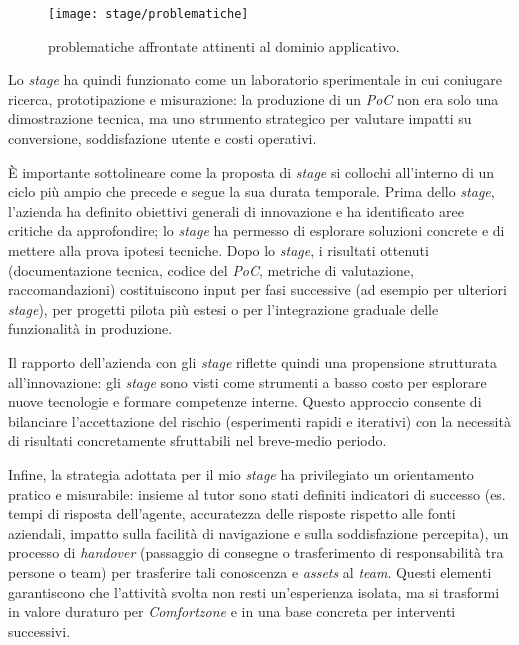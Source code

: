 \begin{figure}[htbp]
  \centering
  \texttt{[image: stage/problematiche]}
  \caption{problematiche affrontate attinenti al dominio applicativo.}
  \label{fig:problematiche}
\end{figure}
 
Lo \emph{stage} ha quindi funzionato come un laboratorio sperimentale in cui coniugare ricerca, prototipazione e misurazione: la produzione di un \emph{PoC} non era solo una dimostrazione tecnica, 
ma uno strumento strategico per valutare impatti su conversione, soddisfazione utente e costi operativi.

È importante sottolineare come la proposta di \emph{stage} si collochi all'interno di un ciclo più ampio che precede e segue la sua durata temporale. Prima dello \emph{stage}, 
l'azienda ha definito obiettivi generali di innovazione e ha identificato aree critiche da approfondire; lo \emph{stage} ha permesso di esplorare soluzioni concrete e di mettere 
alla prova ipotesi tecniche. Dopo lo \emph{stage}, i risultati ottenuti (documentazione tecnica, codice del \emph{PoC}, metriche di valutazione, raccomandazioni) 
costituiscono input per fasi successive (ad esempio per ulteriori \emph{stage}), per progetti pilota più estesi o per l'integrazione graduale delle funzionalità in produzione.

Il rapporto dell'azienda con gli \emph{stage} riflette quindi una propensione strutturata all'innovazione: gli \emph{stage} sono visti come strumenti a basso costo per esplorare nuove tecnologie e
formare competenze interne. Questo approccio consente di bilanciare l'accettazione del rischio (esperimenti rapidi e iterativi) 
con la necessità di risultati concretamente sfruttabili nel breve-medio periodo.

Infine, la strategia adottata per il mio \emph{stage} ha privilegiato un orientamento pratico e misurabile: insieme al tutor sono stati definiti indicatori di successo 
(es. tempi di risposta dell'agente, accuratezza delle risposte rispetto alle fonti aziendali, impatto sulla facilità di navigazione e sulla soddisfazione percepita), 
un processo di \emph{handover} (passaggio di consegne o trasferimento di responsabilità tra persone o team) per trasferire tali conoscenza e \emph{assets} al \emph{team}. 
Questi elementi garantiscono che l'attività svolta non resti 
un'esperienza isolata, ma si trasformi in valore duraturo per \emph{Comfortzone} e in una base concreta per interventi successivi.










